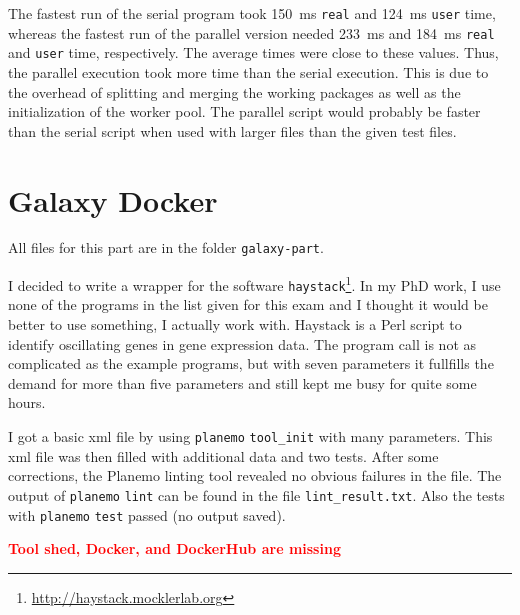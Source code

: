 \documentclass[paper=a4, 12pt]{scrartcl}
\newcommand{\xxx}[1]{\textbf{\textcolor{red}{#1}}}	%
\begin{document}
The fastest run of the serial program took 150~ms \texttt{real} and 124~ms \texttt{user} time, whereas the fastest run of the parallel version needed 233~ms and 184~ms \texttt{real} and \texttt{user} time, respectively. The average times were close to these values. Thus, the parallel execution took more time than the serial execution. This is due to the overhead of splitting and merging the working packages as well as the initialization of the worker pool. The parallel script would probably be faster than the serial script when used with larger files than the given test files.

\section{Galaxy Docker}

All files for this part are in the folder \texttt{galaxy-part}.

I decided to write a wrapper for the software \texttt{haystack}\footnote{\url{http://haystack.mocklerlab.org}}. In my PhD work, I use none of the programs in the list given for this exam and I thought it would be better to use something, I actually work with. Haystack is a Perl script to identify oscillating genes in gene expression data. The program call is not as complicated as the example programs, but with seven parameters it fullfills the demand for more than five parameters and still kept me busy for quite some hours.

I got a basic xml file by using \texttt{planemo} \texttt{tool\_init} with many parameters. This xml file was then filled with additional data and two tests. After some corrections, the Planemo linting tool revealed no obvious failures in the file. The output of \texttt{planemo} \texttt{lint} can be found in the file \texttt{lint_result.txt}. Also the tests with \texttt{planemo} \texttt{test} passed (no output saved).

\xxx{Tool shed, Docker, and DockerHub are missing}
\end{document}
